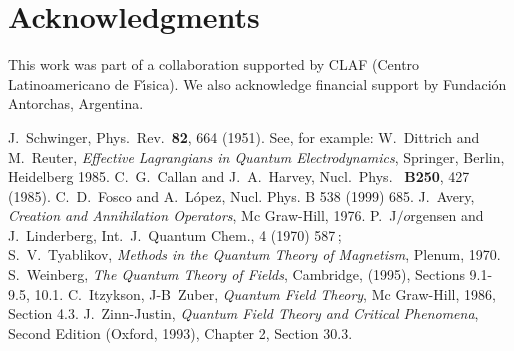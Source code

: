 \documentclass[a4paper,12pt]{article}
\begin{document}
\section*{Acknowledgments}
This work was part of a collaboration supported by CLAF (Centro
Latinoamericano de F{\'\i}sica). We also acknowledge financial support by
Fundaci{\'o}n Antorchas, Argentina.
\begin{thebibliography}{99}
J.~Schwinger, Phys.~Rev.~{\bf 82}, 664 (1951).
See, for example: W.~Dittrich and M.~Reuter,
{\em Effective Lagrangians in Quantum Electrodynamics}, Springer, Berlin,
Heidelberg 1985.
C.\ G.\ Callan and J.\ A.\ Harvey, Nucl.\ Phys.\ {\bf
    B250}, 427 (1985).
C.~D.~Fosco and A.~L{\'o}pez, Nucl. Phys. B 538 (1999)
  685.
J.~Avery, {\em Creation and Annihilation Operators}, 
Mc Graw-Hill, 1976.
P.~J$/\!\!\!o$rgensen and J.~Linderberg,
  Int.~J.~Quantum Chem., 4 (1970) 587\,;\\
  S.~V.~Tyablikov, {\em Methods in the Quantum Theory of Magnetism}, Plenum, 1970.  
S.~Weinberg, {\em The Quantum
    Theory of Fields}, Cambridge, (1995), Sections 9.1-9.5, 10.1.
C.~Itzykson, J-B~Zuber, {\em Quantum Field Theory},
  Mc Graw-Hill, 1986, Section 4.3.
J.~Zinn-Justin, {\em Quantum Field Theory and
    Critical Phenomena}, Second Edition (Oxford, 1993), Chapter 2,
  Section 30.3.
\end{thebibliography}
\end{document}
